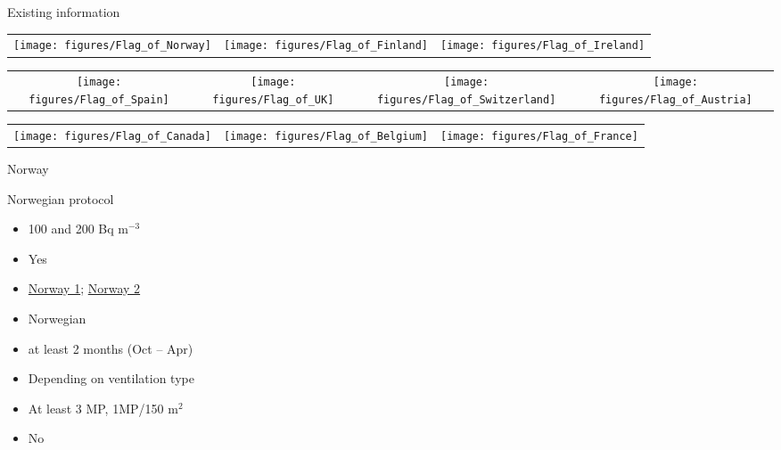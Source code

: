 \documentclass[xcolor=svgnames]{beamer}
\newcommand{\1}{\'{\i}}
\begin{document}
\begin{frame}{Existing information}

\begin{table}
\centering
\begin{tabular}{ccc}

\texttt{[image: figures/Flag\_of\_Norway]} & \texttt{[image: figures/Flag\_of\_Finland]} & \texttt{[image: figures/Flag\_of\_Ireland]} \\

\end{tabular}
\end{table}

\begin{table}
\centering
\begin{tabular}{cccc}

\texttt{[image: figures/Flag\_of\_Spain]} & \texttt{[image: figures/Flag\_of\_UK]} & \texttt{[image: figures/Flag\_of\_Switzerland]} & \texttt{[image: figures/Flag\_of\_Austria]} \\

\end{tabular}
\end{table}

\begin{table}
\centering
\begin{tabular}{ccc}

\texttt{[image: figures/Flag\_of\_Canada]} & \texttt{[image: figures/Flag\_of\_Belgium]}  & \texttt{[image: figures/Flag\_of\_France]} \\

\end{tabular}
\end{table}

\end{frame}

\begin{frame}{Norway}

\begin{exampleblock}{Norwegian protocol}

\begin{itemize}[font=\bfseries, leftmargin=3.5cm]
\item[Limit] 100 and 200 Bq m$^{-3}$
\item[Protocol] Yes
\item[Link] \href{www.arbeidstilsynet.no/veiledning.html?tid=231659}{Norway 1}; \href{http://www.nrpa.no/filer/e70afdac3d.pdf}{Norway 2}
\item[Language] Norwegian
\item[Measuring period] at least 2 months (Oct -- Apr)
\item[Correction] Depending on ventilation type
\item[Rules] At least 3 MP, 1MP/150 m$^{2}$
\item[Other protocols] No
\end{itemize}

\end{exampleblock}

\end{frame}
\end{document}
